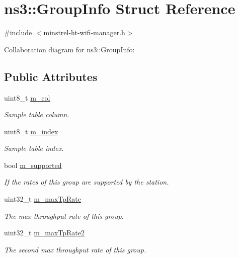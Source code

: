 \hypertarget{structns3_1_1GroupInfo}{}\section{ns3\+:\+:Group\+Info Struct Reference}
\label{structns3_1_1GroupInfo}


{\ttfamily \#include $<$minstrel-\/ht-\/wifi-\/manager.\+h$>$}



Collaboration diagram for ns3\+:\+:Group\+Info\+:
\subsection*{Public Attributes}
\begin{DoxyCompactItemize}
\item 
uint8\+\_\+t \hyperlink{structns3_1_1GroupInfo_ad47bd3477b8a798eecdbcf33610d2a9a}{m\+\_\+col}
\begin{DoxyCompactList}\small\item\em Sample table column. \end{DoxyCompactList}\item 
uint8\+\_\+t \hyperlink{structns3_1_1GroupInfo_a42c8e704ebaf910a2211b8300a85c5ff}{m\+\_\+index}
\begin{DoxyCompactList}\small\item\em Sample table index. \end{DoxyCompactList}\item 
bool \hyperlink{structns3_1_1GroupInfo_a0dcfb117f59a3314f76ecb12493a76df}{m\+\_\+supported}
\begin{DoxyCompactList}\small\item\em If the rates of this group are supported by the station. \end{DoxyCompactList}\item 
uint32\+\_\+t \hyperlink{structns3_1_1GroupInfo_a072b4d31fd42e1608f13ba940bab4dbe}{m\+\_\+max\+Tp\+Rate}
\begin{DoxyCompactList}\small\item\em The max throughput rate of this group. \end{DoxyCompactList}\item 
uint32\+\_\+t \hyperlink{structns3_1_1GroupInfo_ae2bbabe645229fa186236594d54a5c09}{m\+\_\+max\+Tp\+Rate2}
\begin{DoxyCompactList}\small\item\em The second max throughput rate of this group. \end{DoxyCompactList}\item 

\end{DoxyCompactItemize}
